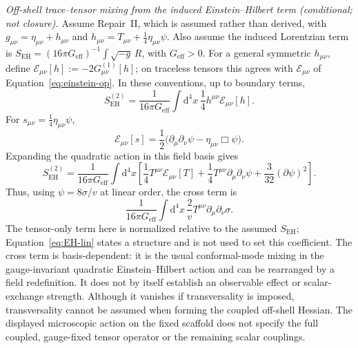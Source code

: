 \emph{Off-shell trace--tensor mixing from the induced
Einstein--Hilbert term (conditional; not closure).}
Assume Repair~II, which is assumed rather than derived, with
\(g_{\mu\nu}=\eta_{\mu\nu}+h_{\mu\nu}\) and
\(h_{\mu\nu}=T_{\mu\nu}+\tfrac14\eta_{\mu\nu}\psi\). Also assume the
induced Lorentzian term is
\(S_{\mathrm{EH}}=(16\pi G_{\mathrm{eff}})^{-1}\int\sqrt{-g}\,R\),
with \(G_{\mathrm{eff}}>0\). For a general symmetric \(h_{\mu\nu}\),
define \(\mathcal E_{\mu\nu}[h]:=-2G^{(1)}_{\mu\nu}[h]\); on traceless
tensors this agrees with \(\mathcal E_{\mu\nu}\) of
Equation~\ref{eq:einstein-op}. In these conventions, up to boundary
terms,
\[
  S_{\mathrm{EH}}^{(2)}
  =\frac{1}{16\pi G_{\mathrm{eff}}}
   \int\mathrm{d}^4x\,\frac14 h^{\mu\nu}\mathcal E_{\mu\nu}[h].
\]
For \(s_{\mu\nu}=\tfrac14\eta_{\mu\nu}\psi\),
\[
  \mathcal E_{\mu\nu}[s]
  =\frac12\bigl(\partial_\mu\partial_\nu\psi
                -\eta_{\mu\nu}\Box\psi\bigr).
\]
Expanding the quadratic action in this field basis gives
\[
  S_{\mathrm{EH}}^{(2)}
  =\frac{1}{16\pi G_{\mathrm{eff}}}
   \int\mathrm{d}^4x\left[
     \frac14T^{\mu\nu}\mathcal E_{\mu\nu}[T]
    +\frac14T^{\mu\nu}\partial_\mu\partial_\nu\psi
    +\frac{3}{32}(\partial\psi)^2
   \right].
\]
Thus, using \(\psi=8\sigma/v\) at linear order, the cross term is
\[
  \frac{1}{16\pi G_{\mathrm{eff}}}
  \int\mathrm{d}^4x\,\frac{2}{v}
  T^{\mu\nu}\partial_\mu\partial_\nu\sigma .
\]
The tensor-only term here is normalized relative to the assumed
\(S_{\mathrm{EH}}\); Equation~\ref{eq:EH-lin} states a structure and
is not used to set this coefficient. The cross term is
basis-dependent: it is the usual conformal-mode mixing in the
gauge-invariant quadratic Einstein--Hilbert action and can be
rearranged by a field redefinition. It does not by itself establish an
observable effect or scalar-exchange strength. Although it vanishes if
transversality is imposed, transversality cannot be assumed when
forming the coupled off-shell Hessian. The displayed microscopic action
on the fixed scaffold does not specify the full coupled, gauge-fixed
tensor operator or the remaining scalar couplings.

